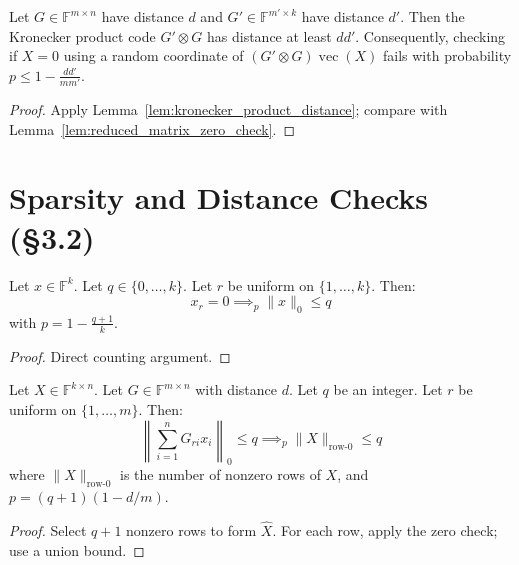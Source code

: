 \begin{lemma}\label{lem:kronecker_product_bound}\leanok {}
Let $G \in \mathbb{F}^{m \times n}$ have distance $d$ and $G' \in \mathbb{F}^{m' \times k}$ have distance $d'$.
Then the Kronecker product code $G' \otimes G$ has distance at least $dd'$.
Consequently, checking if $X = 0$ using a random coordinate of $(G' \otimes G)\operatorname{vec}(X)$ fails with probability $p \le 1 - \frac{dd'}{mm'}$.
\end{lemma}
\begin{proof} \leanok
Apply Lemma~\ref{lem:kronecker_product_distance}; compare with Lemma~\ref{lem:reduced_matrix_zero_check}.
\end{proof}

\section*{Sparsity and Distance Checks (§3.2)}

\begin{lemma}\label{lem:sparsity_check}\leanok {}
Let $x \in \mathbb{F}^k$. Let $q \in \{0, \ldots, k\}$. Let $r$ be uniform on $\{1, \ldots, k\}$.
Then:
\[ x_r = 0 \implies_{p} \|x\|_0 \leq q \]
with $p = 1 - \frac{q+1}{k}$.
\end{lemma}
\begin{proof} \leanok
Direct counting argument.
\end{proof}

\begin{lemma}\label{lem:matrix_sparsity_check}\leanok {}
Let $X \in \mathbb{F}^{k \times n}$. Let $G \in \mathbb{F}^{m \times n}$ with distance $d$. Let $q$ be an integer.
Let $r$ be uniform on $\{1, \ldots, m\}$.
Then:
\[ \left\|\sum_{i=1}^n G_{ri} x_i\right\|_0 \leq q \implies_{p} \|X\|_{\text{row-0}} \leq q \]
where $\|X\|_{\text{row-0}}$ is the number of nonzero rows of $X$, and $p = (q+1)(1 - d/m)$.
\end{lemma}
\begin{proof} \leanok
Select $q+1$ nonzero rows to form $\hat{X}$. For each row, apply the zero check; use a union bound.
\end{proof}

